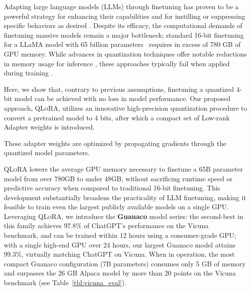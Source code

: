 Adapting large language models (LLMs) through finetuning has proven to be a powerful strategy for enhancing their capabilities \citep{min2021metaicl, wei2021finetuned, ouyang2022training, wang2022super, wang2022self, liu2022few} and for instilling or suppressing specific behaviors as desired \citep{ouyang2022training,askell2021general,bai2022training}. Despite its efficacy, the computational demands of finetuning massive models remain a major bottleneck; standard 16-bit finetuning for a LLaMA model with 65 billion parameters~\citep{touvron2023llama} requires in excess of 780 GB of GPU memory. While advances in quantization techniques offer notable reductions in memory usage for inference \citep{dettmers2022llm, dettmers2022case, frantar2022gptq, xiao2022smoothquant}, these approaches typically fail when applied during training \citep{wortsman2023stable}. 

Here, we show that, contrary to previous assumptions, finetuning a quantized 4-bit model can be achieved with no loss in model performance. Our proposed approach, \textsc{QLoRA}, utilizes an innovative high-precision quantization procedure to convert a pretrained model to 4 bits, after which a compact set of Low-rank Adapter weights \citep{hu2021lora} is introduced. 

These adapter weights are optimized by propagating gradients through the quantized model parameters. 

\textsc{QLoRA} lowers the average GPU memory necessary to finetune a 65B parameter model from over 780GB to under 48GB, without sacrificing runtime speed or predictive accuracy when compared to traditional 16-bit finetuning. This development substantially broadens the practicality of LLM finetuning, making it feasible to train even the largest publicly available models on a single GPU. Leveraging \textsc{QLoRA}, we introduce the \textbf{Guanaco} model series: the second-best in this family achieves 97.8\% of ChatGPT's performance on the Vicuna~\citep{vicuna2023} benchmark, and can be trained within 12 hours using a consumer-grade GPU; with a single high-end GPU over 24 hours, our largest Guanaco model attains 99.3\%, virtually matching ChatGPT on Vicuna. When in operation, the most compact Guanaco configuration (7B parameters) consumes only 5 GB of memory and surpasses the 26 GB Alpaca model by more than 20 points on the Vicuna benchmark (see Table~\ref{tbl:vicuna_eval}).

